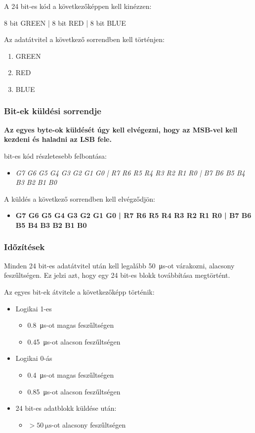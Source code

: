\documentclass[10pt]{article} %
\begin{document}
A 24 bit-es kód a következőképpen kell kinézzen:

8 bit GREEN | 8 bit RED | 8 bit BLUE

Az adatátvitel a következő sorrendben kell történjen: 
\begin{enumerate}
	\item GREEN
	\item RED
	\item BLUE
\end{enumerate}

\subsubsection{Bit-ek küldési sorrendje}

\textbf{Az egyes byte-ok küldését úgy kell elvégezni, hogy az MSB-vel kell kezdeni és haladni az LSB fele.}

 bit-es kód részletesebb felbontása: 
\begin{itemize}
\item \textit{G7 G6 G5 G4 G3 G2 G1 G0 | R7 R6 R5 R4 R3 R2 R1 R0 | B7 B6 B5 B4 B3 B2 B1 B0}
\end{itemize}

\noindent A küldés a következő sorrendben kell elvégződjön: 
\begin{itemize}
\item \textbf{G7 G6 G5 G4 G3 G2 G1 G0 | R7 R6 R5 R4 R3 R2 R1 R0 | B7 B6 B5 B4 B3 B2 B1 B0}
\end{itemize}

\subsubsection{Időzítések}

Minden 24 bit-es adatátvitel után kell legalább \SI{50}{\micro\second}-ot várakozni, alacsony feszűltségen. Ez jelzi azt, hogy egy 24 bit-es blokk továbbítása megtörtént.

\noindent Az egyes bit-ek átvitele a következőképp történik:

\begin{itemize}
\item Logikai 1-es
	\begin{itemize}
	\item \SI{0.8}{\micro\second}-ot magas feszűltségen
	\item \SI{0.45}{\micro\second}-ot alacson feszűltségen
	\end{itemize}
\item Logikai 0-ás
	\begin{itemize}
	\item \SI{0.4}{\micro\second}-ot magas feszűltségen
	\item \SI{0.85}{\micro\second}-ot alacson feszűltségen
	\end{itemize}
\item 24 bit-es adatblokk küldése után: 
	\begin{itemize}
		\item $ > \SI{50}{\micro\second}$-ot alacsony feszűltségen
	\end{itemize}
\end{itemize}
\end{document}

